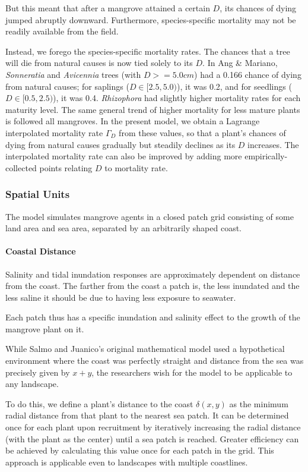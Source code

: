 But this meant that after a mangrove attained a certain $D$, its chances of dying jumped abruptly downward. Furthermore, species-specific mortality may not be readily available from the field.

Instead, we forego the species-specific mortality rates. The chances that a tree will die from natural causes is now tied solely to its $D$. In Ang \& Mariano, \textit{Sonneratia} and \textit{Avicennia} trees (with $D >= 5.0 cm$) had a 0.166 chance of dying from natural causes; for saplings ($D \in [2.5,5.0)$), it was 0.2, and for seedlings ($ D \in [0.5, 2.5)$), it was 0.4. \textit{Rhizophora} had slightly higher mortality rates for each maturity level. The same general trend of higher mortality for less mature plants is followed all mangroves. In the present model, we obtain a Lagrange interpolated mortality rate $\Gamma_D$ from these values, so that a plant's chances of dying from natural causes gradually but steadily declines as its $D$ increases. The interpolated mortality rate can also be improved by adding more empirically-collected points relating $D$ to mortality rate.

\subsubsection{Spatial Units}
The model simulates mangrove agents in a closed patch grid consisting of some land area and sea area, separated by an arbitrarily shaped coast. 


\paragraph{Coastal Distance}
Salinity and tidal inundation responses are approximately dependent on distance from the coast. The farther from the coast a patch is, the less inundated and the less saline it should be due to having less exposure to seawater.

Each patch thus has a specific inundation and salinity effect to the growth of the mangrove plant on it.

While Salmo and Juanico's original mathematical model used a hypothetical environment where the coast was perfectly straight and distance from the sea was precisely given by $x + y$, the researchers wish for the model to be applicable to any landscape. 

To do this, we define a plant's distance to the coast $\delta(x,y)$ as the minimum radial distance from that plant to the nearest sea patch. It can be determined once for each plant upon recruitment by iteratively increasing the radial distance (with the plant as the center) until  a sea patch is reached. Greater efficiency can be achieved by calculating this value once for each patch in the grid. This approach is applicable even to landscapes with multiple coastlines.

